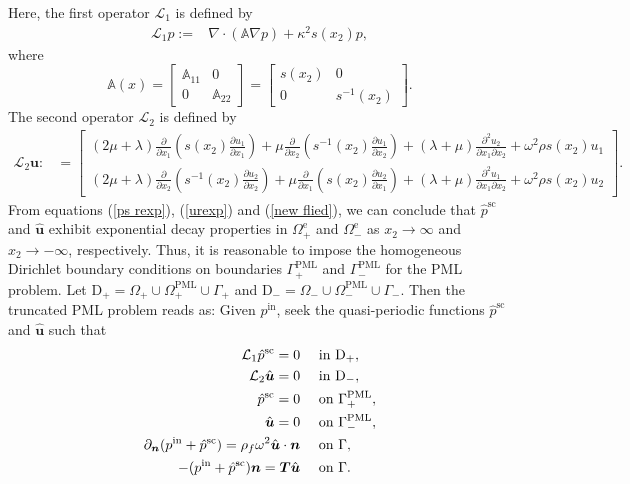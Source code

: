 \documentclass[final,3p,times]{elsarticle}
\begin{document}
Here, the first operator $\mathcal{L}_1$ is defined by
\begin{align*}
	\mathcal{L}_1 p:=&\nabla \cdot(\mathbb{A} \nabla p) + \kappa^2 s\left(x_2\right) p,
\end{align*}
where
$$
\mathbb{A}(x)=\left[\begin{array}{cc}
	\mathbb{A}_{11} & 0 \\
	0 & \mathbb{A}_{22}
\end{array}\right]=\left[\begin{array}{cc}
	s\left(x_2\right) & 0 \\
	0 & s^{-1}(x_2)
\end{array}\right].
$$
The second operator $\mathcal{L}_2$ is defined by
\begin{align*}
	\mathcal{L}_2 \boldsymbol{u}:&=\left[\begin{array}{l}
		(2 \mu + \lambda) \frac{\partial }{\partial x_1}\left(s(x_2) \frac{\partial u_1}{\partial x_1}\right)
		+\mu \frac{\partial }{\partial x_2}\left(s^{-1}(x_2) \frac{\partial u_1}{\partial x_2}\right)
		+ (\lambda + \mu) \frac{\partial^2 u_2}{\partial x_1 \partial x_2}+\omega^2 \rho s(x_2) u_1 \\
		(2 \mu + \lambda) \frac{\partial }{\partial x_2}\left(s^{-1}(x_2) \frac{\partial u_2}{\partial x_2}\right)
		+ \mu  \frac{\partial }{\partial x_1}\left(s(x_2) \frac{\partial u_2}{\partial x_1}\right)
		+ (\lambda+\mu) \frac{\partial^2 u_1}{\partial x_1 \partial x_2} +\omega^2 \rho s(x_2) u_2
	\end{array}\right].
\end{align*}
From equations (\ref{ps rexp}), (\ref{urexp}) and (\ref{new flied}),  we can conclude that $\hat{p}^\mathrm{sc}$ and $\hat{\boldsymbol{u}}$ exhibit exponential decay properties in $\Omega^\mathrm{e}_+$ and $\Omega^\mathrm{e}_-$ as $x_2 \rightarrow \infty$ and $x_2 \rightarrow-\infty$, respectively. Thus, it is reasonable to impose the homogeneous Dirichlet boundary conditions on boundaries $\Gamma_+^{\mathrm{PML}}$ and $\Gamma_-^{\mathrm{PML}}$ for the PML problem. Let  $\mathrm{D}_+=\Omega_+ \cup \Omega_+^{\mathrm{PML}} \cup \Gamma_+$ and $\mathrm{D}_-=\Omega_- \cup \Omega_-^{\mathrm{PML}} \cup \Gamma_-$.
Then the truncated PML problem reads as: Given $p^\mathrm{in}$, seek the quasi-periodic functions $\hat{p}^\mathrm{sc}$ and $\hat{\boldsymbol{u}}$ such that 
\begin{align}\label{trun PMLproblem}
	\mathcal{L}_1\hat{p}^\mathrm{sc} =0  &\quad \text { in } \mathrm{D}_+, \notag\\
	\mathcal{L}_2 \hat{\boldsymbol{u}} =0 & \quad\text { in } \mathrm{D}_-, \notag\\ 
	\hat{p}^\mathrm{sc} = 0 &\quad \text { on } \Gamma_+^{\mathrm{PML}},\\ \hat{\boldsymbol{u}} =0 & \quad \text { on }  \Gamma_-^{\mathrm{PML}}, \notag\\ 
	\partial_{\boldsymbol{n}} (p^\mathrm{in}+\hat{p}^\mathrm{sc}) =\rho_f \omega^2 \hat{\boldsymbol{u}} \cdot \boldsymbol{n} &\quad \text { on } \Gamma,\notag\\
	-(p^\mathrm{in}+\hat{p}^\mathrm{sc}) \boldsymbol{n} = \boldsymbol{T} \hat{\boldsymbol{u}} &\quad \text { on } \Gamma. \notag
\end{align}
\end{document}
